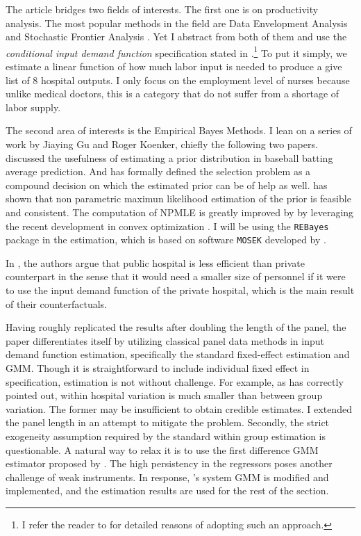 \documentclass[12pt]{article}
\begin{document}
The article bridges two fields of interests. The first one is on productivity
analysis. The most popular methods in the field are Data Envelopment Analysis
\citep{charnes1978measuring} and Stochastic Frontier Analysis
\citep{aigner1977formulation,meeusen1977efficiency}. Yet I abstract from both
of them and use the \textit{conditional input demand function} specification
stated in \cite{croiset2024hospitals}.\footnote{I refer the reader to
    \citet{croiset2024hospitals} for detailed reasons of adopting such an
    approach.} To put it simply, we estimate a linear function of how much labor
input is needed to produce a give list of 8 hospital outputs. I only focus on
the employment level of nurses because unlike medical doctors, this is a
category that do not suffer from a shortage of labor supply.

The second area of interests is the Empirical Bayes Methods. I lean on a series
of work by Jiaying Gu and Roger Koenker, chiefly the following two papers.
\citet{gu2017empirical} discussed the usefulness of estimating a prior
distribution in baseball batting average prediction. And
\citet{gu2023invidious} has formally defined the selection problem as a
compound decision on which the estimated prior can be of help as well.
\citet{kiefer1956consistency} has shown that non parametric maximun likelihood
estimation of the prior is feasible and consistent. The computation of NPMLE is
greatly improved by \citet{koenker2014convex} by leveraging the recent
development in convex optimization \citep{andersen2010mosek}. I will be using
the \verb+REBayes+ package \citep{koenker2017rebayes} in the estimation, which
is based on software \verb+MOSEK+ developed by \citet{andersen2010mosek}.

In \cite{croiset2024hospitals}, the authors argue that public hospital is less
efficient than private counterpart in the sense that it would need a smaller
size of personnel if it were to use the input demand function of the private
hospital, which is the main result of their counterfactuals.

Having roughly replicated the results after doubling the length of the panel,
the paper differentiates itself by utilizing classical panel data methods in
input demand function estimation, specifically the standard fixed-effect
estimation and GMM. Though it is straightforward to include individual fixed
effect in specification, estimation is not without challenge. For example, as
\citet{croiset2024hospitals} has correctly pointed out, within hospital
variation is much smaller than between group variation. The former may be
insufficient to obtain credible estimates. I extended the panel length in an
attempt to mitigate the problem. Secondly, the strict exogeneity assumption
required by the standard within group estimation is questionable. A natural way
to relax it is to use the first difference GMM estimator proposed by
\citet{arellano1991some}. The high persistency in the regressors poses another
challenge of weak instruments. In response,
\citet{arellano1995another,blundell1998initial}'s system GMM is modified and
implemented, and the estimation results are used for the rest of the section.
\end{document}
